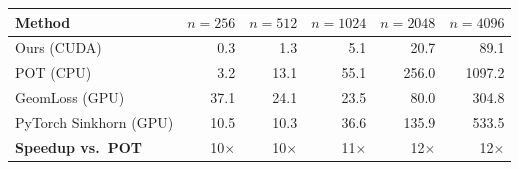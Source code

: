 \begin{tabular}{l r r r r r}
\toprule
\textbf{Method} & $n{=}256$ & $n{=}512$ & $n{=}1024$ & $n{=}2048$ & $n{=}4096$ \\
\midrule
Ours (CUDA) & 0.3 & 1.3 & 5.1 & 20.7 & 89.1 \\
POT (CPU) & 3.2 & 13.1 & 55.1 & 256.0 & 1097.2 \\
GeomLoss (GPU) & 37.1 & 24.1 & 23.5 & 80.0 & 304.8 \\
PyTorch Sinkhorn (GPU) & 10.5 & 10.3 & 36.6 & 135.9 & 533.5 \\
\midrule
\textbf{Speedup vs.\ POT} & 10$\times$ & 10$\times$ & 11$\times$ & 12$\times$ & 12$\times$ \\
\bottomrule
\end{tabular}